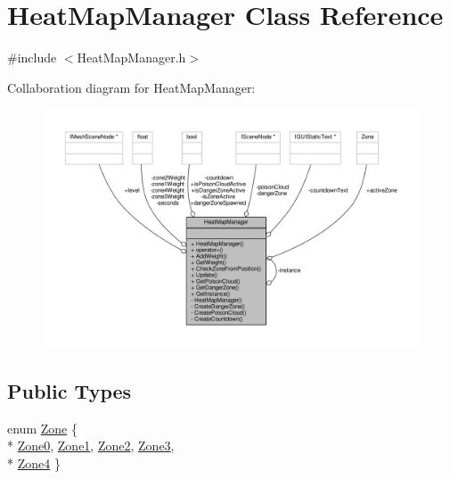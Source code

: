 \hypertarget{class_heat_map_manager}{\section{Heat\-Map\-Manager Class Reference}
\label{class_heat_map_manager}
}


{\ttfamily \#include $<$Heat\-Map\-Manager.\-h$>$}



Collaboration diagram for Heat\-Map\-Manager\-:
\nopagebreak
\begin{figure}[H]
\begin{center}
\leavevmode
\includegraphics[width=350pt]{class_heat_map_manager__coll__graph}
\end{center}
\end{figure}
\subsection*{Public Types}
\begin{DoxyCompactItemize}
\item 
enum \hyperlink{class_heat_map_manager_a6d43bc39106e6d2e72437f8902a586b6}{Zone} \{ \\*
\hyperlink{class_heat_map_manager_a6d43bc39106e6d2e72437f8902a586b6ac37611b7d855043c25ffc9866b2145fc}{Zone0}, 
\hyperlink{class_heat_map_manager_a6d43bc39106e6d2e72437f8902a586b6ac12fb3749b1e4eb1e472927e11bfd45b}{Zone1}, 
\hyperlink{class_heat_map_manager_a6d43bc39106e6d2e72437f8902a586b6a3e20dce2afa7429facffa3cc1b41fcc3}{Zone2}, 
\hyperlink{class_heat_map_manager_a6d43bc39106e6d2e72437f8902a586b6a400a98ad8579431fad61d4325b5c9694}{Zone3}, 
\\*
\hyperlink{class_heat_map_manager_a6d43bc39106e6d2e72437f8902a586b6a39c3884e0f29b1453a01317ffc283a85}{Zone4}
 \}
\end{DoxyCompactItemize}
